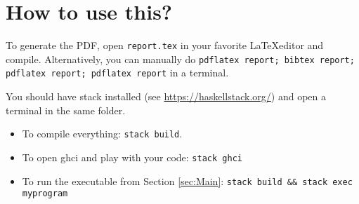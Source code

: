
\section{How to use this?}

To generate the PDF, open \texttt{report.tex} in your favorite \LaTeX editor and compile.
Alternatively, you can manually do
\texttt{pdflatex report; bibtex report; pdflatex report; pdflatex report} in a terminal.

You should have stack installed (see \url{https://haskellstack.org/}) and
open a terminal in the same folder.

\begin{itemize}
  \item To compile everything: \verb|stack build|.
  \item To open ghci and play with your code: \verb|stack ghci|
  \item To run the executable from Section \ref{sec:Main}: \verb|stack build && stack exec myprogram|
\end{itemize}
